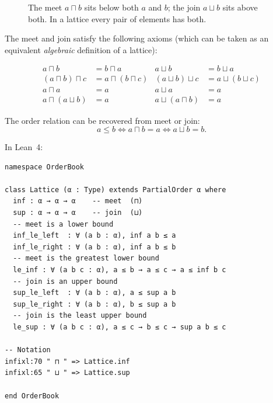 \documentclass[12pt, a4paper, openright]{book}
\theoremstyle{thmstyle}
\theoremstyle{defstyle}
\begin{document}
\begin{figure}[H]
  \centering
  \caption{The meet $a \sqcap b$ sits below both $a$ and $b$; the join
           $a \sqcup b$ sits above both. In a lattice every pair of elements
           has both.}
\end{figure}

The meet and join satisfy the following axioms (which can be taken as an
equivalent \emph{algebraic} definition of a lattice):

\begin{align}
  a \sqcap b &= b \sqcap a   & a \sqcup b &= b \sqcup a \tag{commutativity}\\
  (a \sqcap b) \sqcap c &= a \sqcap (b \sqcap c) &
  (a \sqcup b) \sqcup c &= a \sqcup (b \sqcup c) \tag{associativity}\\
  a \sqcap a &= a  &  a \sqcup a &= a \tag{idempotence}\\
  a \sqcap (a \sqcup b) &= a &  a \sqcup (a \sqcap b) &= a \tag{absorption}
\end{align}

The order relation can be recovered from meet or join:
$$a \leq b \iff a \sqcap b = a \iff a \sqcup b = b.$$

In Lean~4:

\begin{verbatim}
namespace OrderBook

class Lattice (α : Type) extends PartialOrder α where
  inf : α → α → α    -- meet  (⊓)
  sup : α → α → α    -- join  (⊔)
  -- meet is a lower bound
  inf_le_left  : ∀ (a b : α), inf a b ≤ a
  inf_le_right : ∀ (a b : α), inf a b ≤ b
  -- meet is the greatest lower bound
  le_inf : ∀ (a b c : α), a ≤ b → a ≤ c → a ≤ inf b c
  -- join is an upper bound
  sup_le_left  : ∀ (a b : α), a ≤ sup a b
  sup_le_right : ∀ (a b : α), b ≤ sup a b
  -- join is the least upper bound
  le_sup : ∀ (a b c : α), a ≤ c → b ≤ c → sup a b ≤ c

-- Notation
infixl:70 " ⊓ " => Lattice.inf
infixl:65 " ⊔ " => Lattice.sup

end OrderBook
\end{verbatim}
\end{document}

